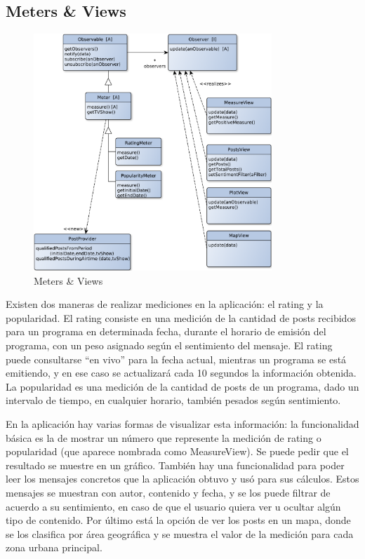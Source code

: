 \subsection{Meters \& Views}

\begin{figure}[H]
\centering
\includegraphics[width=0.8\textwidth]{graph/clase/meters.pdf}
\caption{Meters \& Views}
\end{figure}

Existen dos maneras de realizar mediciones en la aplicación: el rating y la popularidad. El rating consiste en una medición de la cantidad de posts recibidos para un programa en determinada fecha, durante el horario de emisión del programa, con un peso asignado según el sentimiento del mensaje. El rating puede consultarse ``en vivo'' para la fecha actual, mientras un programa se está emitiendo, y en ese caso se actualizará cada 10 segundos la información obtenida. La popularidad es una medición de la cantidad de posts de un programa, dado un intervalo de tiempo, en cualquier horario, también pesados según sentimiento.

En la aplicación hay varias formas de visualizar esta información: la funcionalidad básica es la de mostrar un número que represente la medición de rating o popularidad (que aparece nombrada como MeasureView). Se puede pedir que el resultado se muestre en un gráfico. También hay una funcionalidad para poder leer los mensajes concretos que la aplicación obtuvo y usó para sus cálculos. Estos mensajes se muestran con autor, contenido y fecha, y se los puede filtrar de acuerdo a su sentimiento, en caso de que el usuario quiera ver u ocultar algún tipo de contenido. Por último está la opción de ver los posts en un mapa, donde se los clasifica por área geográfica y se muestra el valor de la medición para cada zona urbana principal.

